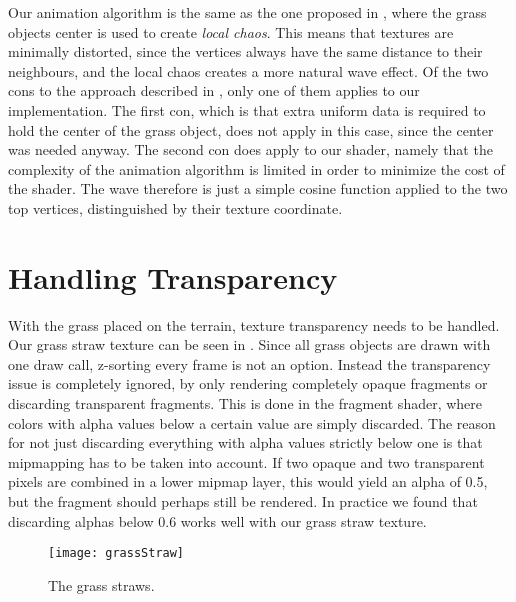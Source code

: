 Our animation algorithm is the same as the one proposed in
, where the grass objects center is
used to create \emph{local chaos}. This means that textures are
minimally distorted, since the vertices always have the same distance
to their neighbours, and the local chaos creates a more natural wave
effect. Of the two cons to the approach described in
, only one of them applies to our
implementation. The first con, which is that extra uniform data is
required to hold the center of the grass object, does not apply in
this case, since the center was needed anyway. The second con does
apply to our shader, namely that the complexity of the animation
algorithm is limited in order to minimize the cost of the shader. The
wave therefore is just a simple cosine function applied to the two top
vertices, distinguished by their texture coordinate.


\section{Handling Transparency}\label{sec:transparency}


With the grass placed on the terrain, texture transparency needs to be
handled. Our grass straw texture can be seen in
. Since all grass objects are drawn with one
draw call, z-sorting every frame is not an option. Instead the
transparency issue is completely ignored, by only rendering completely
opaque fragments or discarding transparent fragments. This is done in
the fragment shader, where colors with alpha values below a certain
value are simply discarded. The reason for not just discarding
everything with alpha values strictly below one is that mipmapping has
to be taken into account. If two opaque and two transparent pixels are
combined in a lower mipmap layer, this would yield an alpha of 0.5,
but the fragment should perhaps still be rendered. In practice we
found that discarding alphas below 0.6 works well with our grass straw
texture.

\begin{figure}
  \centering
  \texttt{[image: grassStraw]}
  \caption{The grass straws.}
  \label{fig:grassStraws}
\end{figure}


